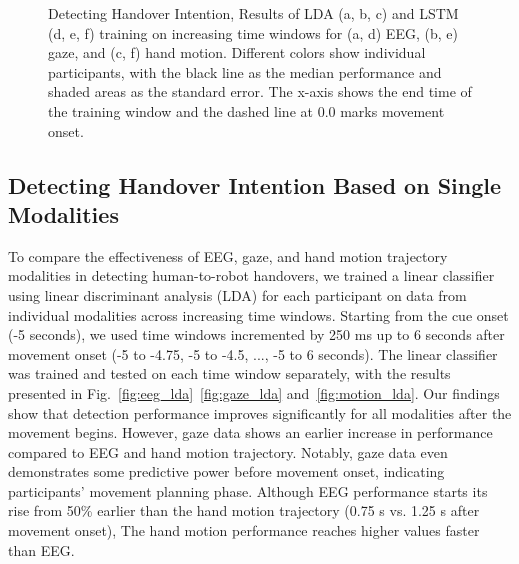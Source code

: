 



\begin{figure}[h!]
    \centering
    \caption{\justifying Detecting Handover Intention, Results of LDA (a, b, c) and LSTM (d, e, f) training on increasing time windows for (a, d) EEG, (b, e) gaze, and (c, f) hand motion. Different colors show individual participants, with the black line as the median performance and shaded areas as the standard error. The x-axis shows the end time of the training window and the dashed line at 0.0 marks movement onset.}
    \label{fig:subj-lda-lstm}
\end{figure}

\subsection*{Detecting Handover Intention Based on Single Modalities} 

To compare the effectiveness of EEG, gaze, and hand motion trajectory modalities in detecting human-to-robot handovers, we trained a linear classifier using linear discriminant analysis (LDA) for each participant on data from individual modalities across increasing time windows. Starting from the cue onset (-5 seconds), we used time windows incremented by 250 ms up to 6 seconds after movement onset (-5 to -4.75, -5 to -4.5, ..., -5 to 6 seconds). The linear classifier was trained and tested on each time window separately, with the results presented in Fig.~\ref{fig:eeg_lda}~\ref{fig:gaze_lda} and~\ref{fig:motion_lda}. 
Our findings show that detection performance improves significantly for all modalities after the movement begins. However, gaze data shows an earlier increase in performance compared to EEG and hand motion trajectory. Notably, gaze data even demonstrates some predictive power before movement onset, indicating participants' movement planning phase. Although EEG performance starts its rise from 50\% earlier than the hand motion trajectory (0.75 s vs. 1.25 s after movement onset), The hand motion performance reaches higher values faster than EEG. 

